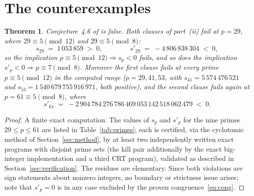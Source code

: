 \documentclass[10pt]{article}
\newtheorem{theorem}{Theorem}[section]
\theoremstyle{remark}
\begin{document}
\section{The counterexamples}\label{sec:results}

\begin{theorem}\label{thm:main}
Conjecture~4.6 of \cite{Sun2021} is false. Both clauses of part~(ii) fail
at $p=29$, where $29\equiv 5\pmod{12}$ and $29\equiv 5\pmod 8$:
\[
s_{29} \;=\; 1\,053\,859 \;>\; 0,
\qquad\qquad
s'_{29} \;=\; -4\,806\,838\,304 \;<\; 0,
\]
so the implication $p\equiv 5\pmod{12}\Rightarrow s_p<0$ fails, and so does
the implication $s'_p<0\Rightarrow p\equiv 7\pmod 8$. Moreover the
first clause fails at every prime $p\equiv 5\pmod{12}$ in the computed
range ($p=29,41,53$, with $s_{41}=5\,574\,476\,521$ and
$s_{53}=1\,540\,679\,755\,916\,971$, both positive), and the second clause
fails again at $p=61\equiv 5\pmod 8$, where
\[
s'_{61}\;=\;-2\,904\,784\,276\,786\,469\,053\,142\,518\,062\,479\;<\;0.
\]
\end{theorem}

\begin{proof}
A finite exact computation. The values of $s_p$ and $s'_p$ for the nine
primes $29\le p\le 61$ are listed in Table~\ref{tab:primes}; each is
certified, via the cyclotomic method of Section~\ref{sec:method}, by at
least two independently written exact programs with disjoint prime sets
(the kill pair additionally by the exact big-integer implementation and a
third CRT program), validated as described in
Section~\ref{sec:verification}. The residues are elementary. Since both
violations are sign statements about nonzero integers, no boundary or
strictness issue arises; note that $s'_p=0$ is in any case excluded by the
proven congruence~\eqref{eq:cong}.
\end{proof}
\end{document}
